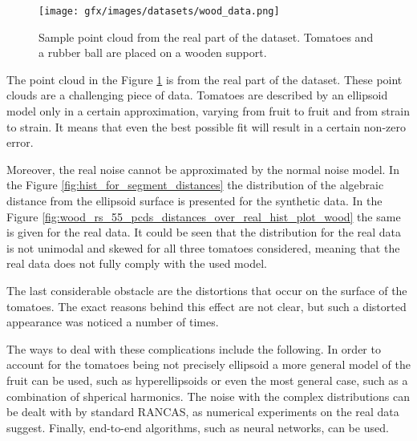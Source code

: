 \begin{figure}[!htb]
  \centering
      \texttt{[image: gfx/images/datasets/wood\_data.png]}
      \caption{Sample point cloud from the real part of the dataset. Tomatoes and a rubber ball are placed on a wooden support.}
      \label{fig:wood_data}
\end{figure}

The point cloud in the Figure \ref{fig:wood_data} is from the real part of the dataset.
These point clouds are a challenging piece of data.
Tomatoes are described by an ellipsoid model only in a certain approximation, varying from fruit to fruit and from strain to strain.
It means that even the best possible fit will result in a certain non-zero error.

Moreover, the real noise cannot be approximated by the normal noise model.
In the Figure \ref{fig:hist_for_segment_distances} the distribution of the algebraic distance from the ellipsoid surface is presented for the synthetic data.
In the Figure \ref{fig:wood_rs_55_pcds_distances_over_real_hist_plot_wood} the same is given for the real data.
It could be seen that the distribution for the real data is not unimodal and skewed for all three tomatoes considered, meaning that the real data does not fully comply with the used model.

The last considerable obstacle are the distortions that occur on the surface of the tomatoes.
The exact reasons behind this effect are not clear, but such a distorted appearance was noticed a number of times.

The ways to deal with these complications include the following.
In order to account for the tomatoes being not precisely ellipsoid a more general model of the fruit can be used, such as hyperellipsoids or even the most general case, such as a combination of shperical harmonics.
The noise with the complex distributions can be dealt with by standard RANCAS, as numerical experiments on the real data suggest.
Finally, end-to-end algorithms, such as neural networks, can be used.

